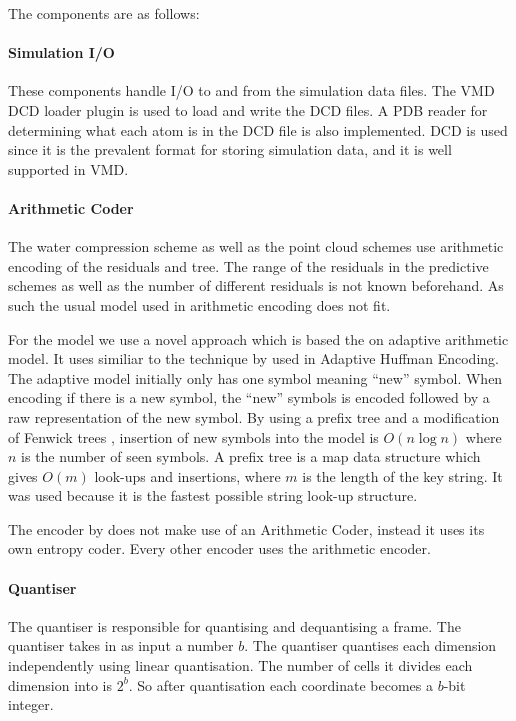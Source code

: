 \documentclass[a4paper]{report}
\begin{document}
The components are as follows:

\paragraph{Simulation I/O}

These components handle I/O to and from the simulation data files. The VMD DCD
loader plugin is used to load and write the DCD files. A PDB reader for
determining what each atom is in the DCD file is also implemented. DCD is used
since it is the prevalent format for storing simulation data, and it is well
supported in VMD.


\paragraph{Arithmetic Coder}

The water compression scheme as well as the point cloud schemes use arithmetic
encoding of the residuals and tree. The range of the residuals in the
predictive schemes as well as the number of different residuals is not known
beforehand. As such the usual model used in arithmetic encoding does not
fit.

For the model we use a novel approach which is based the on adaptive
arithmetic model. It uses similiar to the technique by
\citet{cormack1984algorithms} used in Adaptive Huffman Encoding. The adaptive
model initially only has one symbol meaning ``new'' symbol. When encoding if
there is a new symbol, the ``new'' symbols is encoded followed by a raw
representation of the new symbol. By using a prefix tree and a modification of
Fenwick trees \citep{fenwick1994new}, insertion of new symbols into the model
is $O(n \log n)$ where $n$ is the number of seen symbols. A prefix tree is a
map data structure which gives $O(m)$ look-ups and insertions, where $m$ is
the length of the key string. It was used because it is the fastest possible
string look-up structure.

The encoder by \citet{omeltchenko2000sls} does not make use of an Arithmetic
Coder, instead it uses its own entropy coder. Every other encoder uses the
arithmetic encoder.


\paragraph{Quantiser}

The quantiser is responsible for quantising and dequantising a frame. The
quantiser takes in as input a number $b$. The quantiser quantises each
dimension independently using linear quantisation. The number of cells it
divides each dimension into is $2^b$. So after quantisation each coordinate
becomes a $b$-bit integer.
\end{document}
